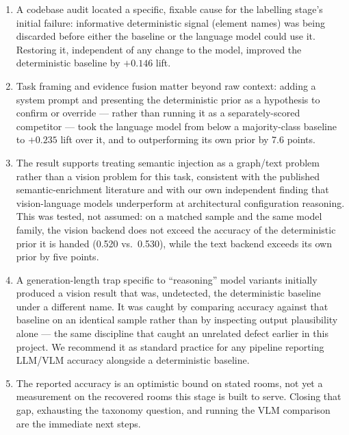 \documentclass[11pt,a4paper]{article}
\begin{document}
\begin{enumerate}
\item A codebase audit located a specific, fixable cause for the labelling
stage's initial failure: informative deterministic signal (element names) was
being discarded before either the baseline or the language model could use
it. Restoring it, independent of any change to the model, improved the
deterministic baseline by $+0.146$ lift.
\item Task framing and evidence fusion matter beyond raw context: adding a
system prompt and presenting the deterministic prior as a hypothesis to
confirm or override --- rather than running it as a separately-scored
competitor --- took the language model from below a majority-class baseline
to $+0.235$ lift over it, and to outperforming its own prior by 7.6 points.
\item The result supports treating semantic injection as a graph/text
problem rather than a vision problem for this task, consistent with the
published semantic-enrichment literature and with our own independent finding
that vision-language models underperform at architectural configuration
reasoning. This was tested, not assumed: on a matched sample and the same
model family, the vision backend does not exceed the accuracy of the
deterministic prior it is handed (0.520 vs.\ 0.530), while the text backend
exceeds its own prior by five points.
\item A generation-length trap specific to ``reasoning'' model variants
initially produced a vision result that was, undetected, the deterministic
baseline under a different name. It was caught by comparing accuracy against
that baseline on an identical sample rather than by inspecting output
plausibility alone --- the same discipline that caught an unrelated defect
earlier in this project. We recommend it as standard practice for any
pipeline reporting LLM/VLM accuracy alongside a deterministic baseline.
\item The reported accuracy is an optimistic bound on stated rooms, not yet a
measurement on the recovered rooms this stage is built to serve. Closing that
gap, exhausting the taxonomy question, and running the VLM comparison are the
immediate next steps.
\end{enumerate}
\end{document}
